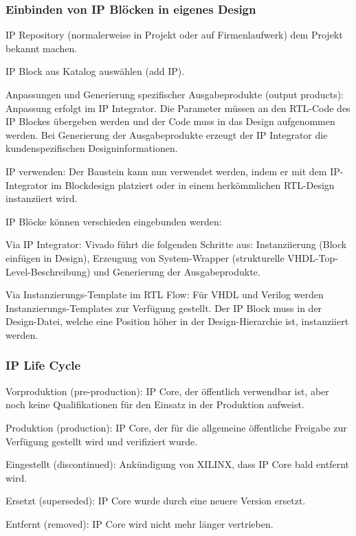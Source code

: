 \subsubsection{Einbinden von IP Blöcken in eigenes Design}
\begin{compactenum}
    \item IP Repository (normalerweise in Projekt oder auf Firmenlaufwerk) dem Projekt bekannt machen.
    \item IP Block aus Katalog auswählen (add IP).
    \item Anpassungen und Generierung spezifischer Ausgabeprodukte (output products): Anpassung erfolgt im IP Integrator. Die Parameter müssen an den RTL-Code des IP Blockes übergeben werden und der Code muss in  das Design aufgenommen werden. Bei Generierung der Ausgabeprodukte erzeugt der IP Integrator die kundenspezifischen Designinformationen.
    \item IP verwenden: Der Baustein kann nun verwendet werden, indem er mit dem IP-Integrator im Blockdesign platziert oder in einem herkömmlichen RTL-Design instanziiert wird.
\end{compactenum}
IP Blöcke können verschieden eingebunden werden:
\begin{compactitem}
        \item Via IP Integrator: Vivado führt die folgenden Schritte aus: Instanziierung (Block einfügen in Design), Erzeugung von System-Wrapper (strukturelle VHDL-Top-Level-Beschreibung) und Generierung der Ausgabeprodukte.
        \item Via Instanzierungs-Template im RTL Flow: Für VHDL und Verilog werden Instanzierungs-Templates zur Verfügung gestellt. Der IP Block muss in der Design-Datei, welche eine Position höher in der Design-Hierarchie ist, instanziiert werden.
\end{compactitem}

\subsubsection{IP Life Cycle}
\begin{compactitem}
        \item Vorproduktion (pre-production): IP Core, der öffentlich verwendbar ist, aber noch keine Qualifikationen für den Einsatz in der Produktion aufweist.
        \item Produktion (production): IP Core, der für die allgemeine öffentliche Freigabe zur Verfügung gestellt wird und verifiziert wurde.
        \item Eingestellt (discontinued): Ankündigung von XILINX, dass IP Core bald entfernt wird.
        \item Ersetzt (superseded): IP Core wurde durch eine neuere Version ersetzt.
        \item Entfernt (removed): IP Core wird nicht mehr länger vertrieben.
\end{compactitem}
